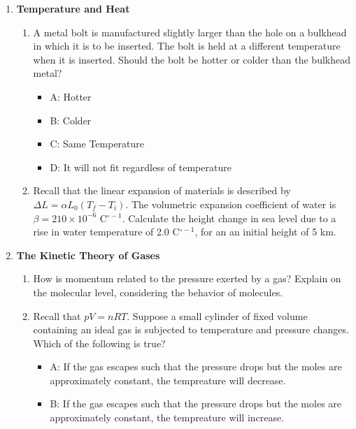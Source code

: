 \documentclass[10pt]{article}
\begin{document}
\maketitle

\begin{enumerate}
\item \textbf{Temperature and Heat}
\begin{enumerate}
\item A metal bolt is manufactured slightly larger than the hole on a bulkhead in which it is to be inserted. The bolt is held at a different temperature when it is inserted. Should the bolt be hotter or colder than the bulkhead metal?
\begin{itemize}
\item A: Hotter
\item B: Colder
\item C: Same Temperature
\item D: It will not fit regardless of temperature
\end{itemize}
\item Recall that the linear expansion of materials is described by $\Delta L = \alpha L_0 \left(T_f - T_i \right)$.  The volumetric expansion coefficient of water is $\beta = 210 \times 10^{-6}$ C$^{\circ -1}$.  Calculate the height change in sea level due to a rise in water temperature of 2.0 C$^{\circ -1}$, for an an initial height of 5 km. \\ \vspace{2cm}
\end{enumerate}
\item \textbf{The Kinetic Theory of Gases}
\begin{enumerate}
\item How is momentum related to the pressure exerted by a gas? Explain on the molecular level, considering the behavior of molecules. \\ \vspace{1cm}
\item Recall that $pV = n R T$.  Suppose a small cylinder of fixed volume containing an ideal gas is subjected to temperature and pressure changes.  Which of the following is true?
\begin{itemize}
\item A: If the gas escapes such that the pressure drops but the moles are approximately constant, the tempreature will decrease.
\item B: If the gas escapes such that the pressure drops but the moles are approximately constant, the tempreature will increase.

\end{itemize}
\end{enumerate}
\end{enumerate}
\end{document}
